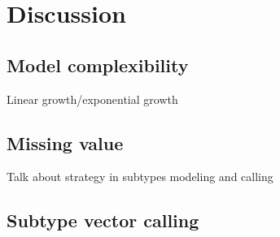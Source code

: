 \documentclass[
  12pt,
]{book}
\begin{document}
\hypertarget{discussion}{%
\chapter{Discussion}\label{discussion}}

\hypertarget{model-complexibility}{%
\section{Model complexibility}\label{model-complexibility}}

Linear growth/exponential growth

\hypertarget{missing-value}{%
\section{Missing value}\label{missing-value}}

Talk about strategy in subtypes modeling and calling

\hypertarget{subtypevector}{%
\section{Subtype vector calling}\label{subtypevector}}

  
\end{document}
